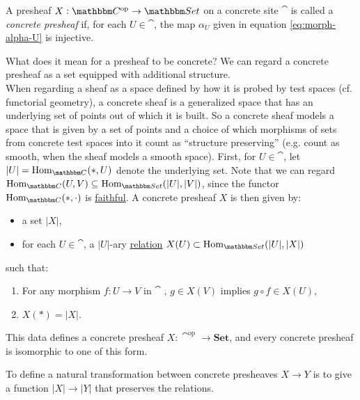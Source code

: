 \documentclass[a4paper,11pt]{article}  %
\begin{document}
\begin{definition}
	A {presheaf} $X : \cat^\op \to \Set$ on a {concrete site} $\cat$ is called a \emph{concrete presheaf} if, for each $U \in \cat$, the map $\alpha_U$ given in equation \eqref{eq:morph-alpha-U} is injective.
\end{definition}

\begin{remark}
	What does it mean for a presheaf to be concrete?
	 We can regard a concrete presheaf as a set equipped with additional structure. \\
	When regarding a sheaf as a space defined by how it is probed by test spaces (cf. functorial geometry), a concrete sheaf is a generalized space that has an underlying set of points out of which it is built.
	So a concrete sheaf models a space that is given by a set of points and a choice of which morphisms of sets from concrete test spaces into it count as “structure preserving” (e.g. count as smooth, when the sheaf models a smooth space).
	First, for $U \in \cat$, let $|U|=\Hom_{\cat}(*,U)$ denote the underlying set. 
	Note that we can regard $\Hom_{\cat}(U, V) \subseteq \Hom_{\Set} (|U|, |V|)$, since the functor $\Hom_{\cat}(*,\cdot)$  is \href{https://ncatlab.org/nlab/show/faithful+functor}{faithful}.
	A concrete presheaf \(X\) is then given by:
	\begin{itemize}
		\item  a set $|X|$,
		\item  for each $U \in \cat$, a $|U|$-ary \href{https://ncatlab.org/nlab/show/relation\#DefinitionGeneralCase}{relation} $X(U) \subset  \Hom_{\Set} (|U|,|X|)$%
	\end{itemize}
	such that:
	\begin{enumerate}
		\item For any morphism $f : U \to V$ in $\cat$ , $ g \in X(V)$ implies $g \circ f \in X(U)$, 
		\item $X(*) = |X|$.
	\end{enumerate}

This data defines a concrete presheaf \(X : \cat^{\mathrm{op}} \to \mathbf{Set}\), and every concrete presheaf is isomorphic to one of this form.

\end{remark}






To define a natural transformation between concrete presheaves \(X \to Y\) is to give a function \(|X| \to |Y|\) that preserves the relations.
\end{document}
